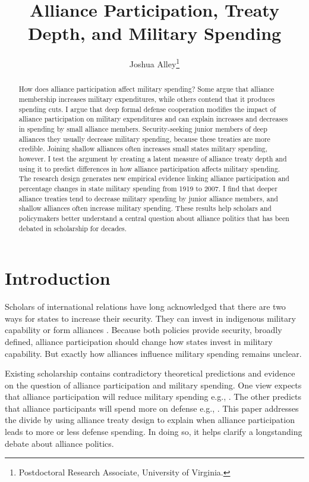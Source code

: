 \documentclass[12pt]{article}
\title{\textbf{Alliance Participation, Treaty Depth, and Military Spending}}
\author{Joshua Alley\footnote{Postdoctoral Research Associate, University of Virginia.}}
\date{}
\begin{document}
\maketitle 

\doublespace 

\begin{abstract}
How does alliance participation affect military spending? 
Some argue that alliance membership increases military expenditures, while others contend that it produces spending cuts.
I argue that deep formal defense cooperation modifies the impact of alliance participation on military expenditures and can explain increases and decreases in spending by small alliance members.  
Security-seeking junior members of deep alliances they usually decrease military spending, because these treaties are more credible.
Joining shallow alliances often increases small states military spending, however.    
I test the argument by creating a latent measure of alliance treaty depth and using it to predict differences in how alliance participation affects military spending. 
The research design generates new empirical evidence linking alliance participation and percentage changes in state military spending from 1919 to 2007. 
I find that deeper alliance treaties tend to decrease military spending by junior alliance members, and shallow alliances often increase military spending.  
These results help scholars and policymakers better understand a central question about alliance politics that has been debated in scholarship for decades. 
\end{abstract}


\newpage 


\section{Introduction}


Scholars of international relations have long acknowledged that there are two ways for states to increase their security. 
They can invest in indigenous military capability or form alliances \citep{Morgenthau1948, Altfield1984, Morrow1993}.
Because both policies provide security, broadly defined, alliance participation should change how states invest in military capability. 
But exactly how alliances influence military spending remains unclear. 


Existing scholarship contains contradictory theoretical predictions and evidence on the question of alliance participation and military spending. 
One view expects that alliance participation will reduce military spending e.g., \citep{BarnettLevy1991, Morrow1993, Conybeare1994}. 
The other predicts that alliance participants will spend more on defense e.g., \citep{Diehl1994, MorganPalmer2006, QuirozFlores2011}.
This paper addresses the divide by using alliance treaty design to explain when alliance participation leads to more or less defense spending. 
In doing so, it helps clarify a longstanding debate about alliance politics.
\end{document}
